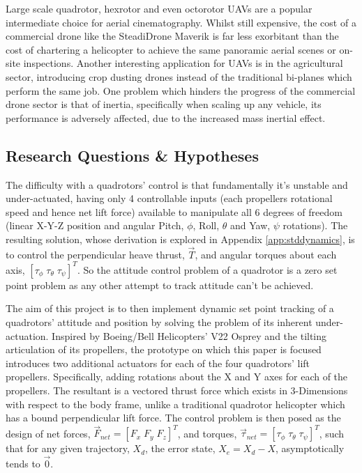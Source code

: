 \par
Large scale quadrotor, hexrotor and even octorotor UAVs are a popular intermediate choice for aerial cinematography.  Whilst still expensive, the cost of a commercial drone like the SteadiDrone Maverik \cite{steadidrone} is far less exorbitant than the cost of chartering a helicopter to achieve the same panoramic aerial scenes or on-site inspections. Another interesting application for UAVs is in the agricultural sector, introducing crop dusting drones instead of the traditional bi-planes which perform the same job. One problem which hinders the progress of the commercial drone sector is that of inertia, specifically when scaling up any vehicle, its performance is adversely affected, due to the increased mass inertial effect.
\subsection{Research Questions \& Hypotheses}
\label{subsec:intro.foreward.hypotheses}
The difficulty with a quadrotors' control is that fundamentally it's unstable and under-actuated, having only 4 controllable inputs (each propellers rotational speed and hence net lift force) available to manipulate all 6 degrees of freedom (linear X-Y-Z position and angular Pitch, $\phi$, Roll, $\theta$ and Yaw, $\psi$ rotations). The resulting solution, whose derivation is explored in Appendix \ref{app:stddynamics}, is to control the perpendicular heave thrust, $\vec{T}$, and angular torques about each axis, $[\tau_\phi\;\tau_\theta\;\tau_\psi]^T$. So the attitude control problem of a quadrotor is a zero set point problem as any other attempt to track attitude can't be achieved.
\par
The aim of this project is to then implement dynamic set point tracking of a quadrotors' attitude and position by solving the problem of its inherent under-actuation. Inspired by Boeing/Bell Helicopters' V22 Osprey and the tilting articulation of its propellers, the prototype on which this paper is focused introduces two additional actuators for each of the four quadrotors' lift propellers. Specifically, adding rotations about the X and Y axes for each of the propellers. The resultant is a vectored thrust force which exists in 3-Dimensions with respect to the body frame, unlike a traditional quadrotor helicopter which has a bound perpendicular lift force. The control problem is then posed as the design of net forces, $\vec{F}_{net} = [F_x\;F_y\;F_z]^T$, and torques, $\vec{\tau}_{net} = [\tau_{\phi}\;\tau_{\theta}\;\tau_{\psi}]^T$, such that for any given trajectory, $X_d$, the error state, $X_e = X_d - X$, asymptotically tends to $\vec{0}$.
